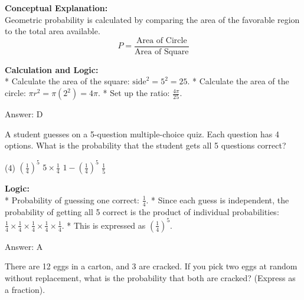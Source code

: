 \documentclass[11pt,paper=a4,answers]{exam}
\begin{document}
\begin{questions}
\begin{solution}
\textbf{Conceptual Explanation:} \\
Geometric probability is calculated by comparing the area of the favorable region to the total area available. 
\[ P = \frac{\text{Area of Circle}}{\text{Area of Square}} \]



\vspace{30pt}

\textbf{Calculation and Logic:} \\
* Calculate the area of the square: $\text{side}^2 = 5^2 = 25$.
* Calculate the area of the circle: $\pi r^2 = \pi (2^2) = 4\pi$.
* Set up the ratio: $\frac{4\pi}{25}$.

\vspace{30pt}

Answer: \colorbox{yellow!100}{D}
\end{solution}

\vspace{60pt}

\question
A student guesses on a 5-question multiple-choice quiz. Each question has 4 options. What is the probability that the student gets all 5 questions correct?
\begin{tasks}(4)
    \task $(\frac{1}{4})^5$
    \task $5 \times \frac{1}{4}$
    \task $1 - (\frac{1}{4})^5$
    \task $\frac{1}{5}$
\end{tasks}

\begin{solution}
\textbf{Logic:} \\
* Probability of guessing one correct: $\frac{1}{4}$.
* Since each guess is independent, the probability of getting all 5 correct is the product of individual probabilities: $\frac{1}{4} \times \frac{1}{4} \times \frac{1}{4} \times \frac{1}{4} \times \frac{1}{4}$.
* This is expressed as $(\frac{1}{4})^5$.

\vspace{30pt}

Answer: \colorbox{yellow!100}{A}
\end{solution}

\vspace{60pt}

\question
There are 12 eggs in a carton, and 3 are cracked. If you pick two eggs at random without replacement, what is the probability that both are cracked? (Express as a fraction).


\end{questions}
\end{document}
